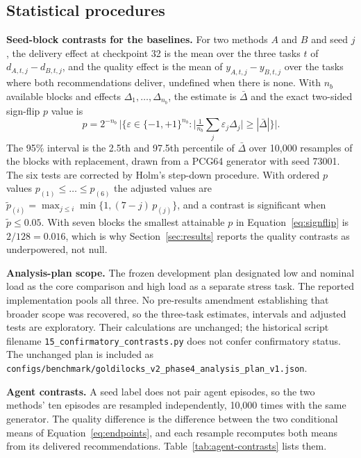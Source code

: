 \subsection{Statistical procedures}

\textbf{Seed-block contrasts for the baselines.} For two methods $A$ and $B$
and seed $j$, the delivery effect at checkpoint 32 is the mean over the three
tasks $t$ of $d_{A,t,j} - d_{B,t,j}$, and the quality effect is the mean of
$y_{A,t,j} - y_{B,t,j}$ over the tasks where both recommendations deliver,
undefined when there is none. With $n_b$ available blocks and effects
$\Delta_1, \dots, \Delta_{n_b}$, the estimate is $\bar{\Delta}$ and the exact
two-sided sign-flip $p$ value is
\begin{equation}
p = 2^{-n_b} \,\bigl| \{ \varepsilon \in \{-1, +1\}^{n_b} :
\bigl| \tfrac{1}{n_b} \textstyle\sum_j \varepsilon_j \Delta_j \bigr| \ge
| \bar{\Delta} | \} \bigr| .
\label{eq:signflip}
\end{equation}
The 95\% interval is the 2.5th and 97.5th percentile of $\bar{\Delta}$ over
10{,}000 resamples of the blocks with replacement, drawn from a PCG64
generator with seed 73001. The six tests are corrected by Holm's step-down procedure. With
ordered $p$ values $p_{(1)} \le \dots \le p_{(6)}$ the adjusted values are
$\tilde{p}_{(i)} = \max_{j \le i} \min\{1, (7 - j)\, p_{(j)}\}$, and a
contrast is significant when $\tilde{p} \le 0.05$. With seven blocks the
smallest attainable $p$ in Equation~\ref{eq:signflip} is $2/128 = 0.016$,
which is why Section~\ref{sec:results} reports the quality contrasts as
underpowered, not null.

\textbf{Analysis-plan scope.} The frozen development plan designated low and
nominal load as the core comparison and high load as a separate stress task.
The reported implementation pools all three. No pre-results amendment
establishing that broader scope was recovered, so the three-task estimates,
intervals and adjusted tests are exploratory. Their calculations are unchanged;
the historical script filename \texttt{15\_confirmatory\_contrasts.py} does not
confer confirmatory status. The unchanged plan is included as
\texttt{configs/benchmark/\allowbreak goldilocks\_v2\_phase4\_analysis\_plan\_v1.json}.

\textbf{Agent contrasts.} A seed label does not pair agent episodes, so the two
methods' ten episodes are resampled independently, 10{,}000 times with the same
generator. The quality difference is the difference between the two
conditional means of Equation~\ref{eq:endpoints}, and each resample
recomputes both means from its delivered recommendations.
Table~\ref{tab:agent-contrasts} lists them.

